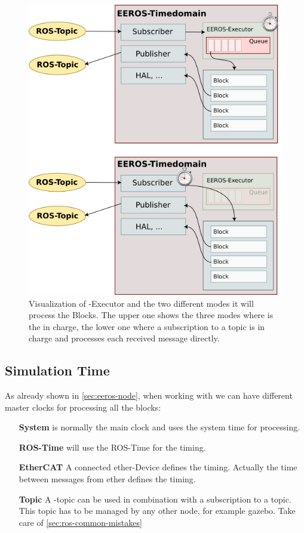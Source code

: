 \begin{figure}[H]
    \centering
    \includegraphics[width=0.6\linewidth]{images/eeros-executor}
    \caption[ Overview]{Visualization of -Executor and the two different modes it will process the Blocks. The upper one shows the three modes where  is the in charge, the lower one where a subscription to a topic is in charge and processes each received message directly.}
    \label{fig:eeros-overview}
\end{figure}


\subsection[Simulation time]{Simulation Time} \label{sec:simulation-time}

As already shown in \ref{sec:eeros-node}, when working with  we can have different master clocks for processing all the blocks:

\begin{itemize}
    \item[\textbf{System}]  is normally the main clock and uses the system time for processing.
    \item[\textbf{ROS-Time}]  will use the ROS-Time for the timing.
    \item[\textbf{EtherCAT}] A connected \Gls{ether}-Device defines the timing.
    Actually the time between messages from \Gls{ether} defines the timing.
    \item[\textbf{Topic}] A -\Gls{topic} can be used in combination with a subscription to a \gls{topic}.
    This \gls{topic} has to be managed by any other node, for example \Gls{gazebo}.
    Take care of \ref{sec:ros-common-mistakes}
\end{itemize}




